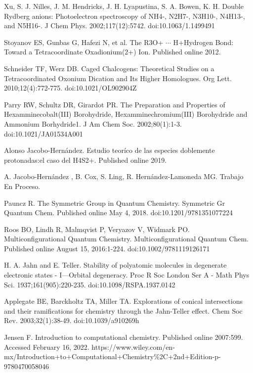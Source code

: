 \documentclass[12pt]{report}
\begin{document}
\begin{thebibliography}{13}
 Xu, S. J. Nilles, J. M. Hendricks, J. H. Lyapustina, S. A. Bowen, K. H. Double Rydberg anions: Photoelectron spectroscopy of NH4-, N2H7-, N3H10-, N4H13-, and N5H16-. J Chem Phys. 2002;117(12):5742. doi:10.1063/1.1499491




 Stoyanov ES, Gunbas G, Hafezi N, et al. The R3O+ $\dotsi$ H+Hydrogen Bond: Toward a Tetracoordinate Oxadionium(2+) Ion. Published online 2012.


  Schneider TF, Werz DB. Caged Chalcogens: Theoretical Studies on a Tetracoordinated Oxonium Dication and Its Higher Homologues. Org Lett. 2010;12(4):772-775. doi:10.1021/OL902904Z


  Parry RW, Schultz DR, Girardot PR. The Preparation and Properties of Hexamminecobalt(III) Borohydride, Hexamminechromium(III) Borohydride and Ammonium Borhydride1. J Am Chem Soc. 2002;80(1):1-3. doi:10.1021/JA01534A001

  Alonso Jacobo-Hernández. Estudio teoríco de las especies doblemente protonadas:el caso del H4S2+. Published online 2019.

 A. 	Jacobo-Hernández  , B. Cox, S. Ling, R. Hernández-Lamoneda MG. Trabajo En Proceso.

  Pauncz R. The Symmetric Group in Quantum Chemistry. Symmetric Gr Quantum Chem. Published online May 4, 2018. doi:10.1201/9781351077224

 Roos BO, Lindh R, Malmqvist P, Veryazov V, Widmark PO. Multiconfigurational Quantum Chemistry. Multiconfigurational Quantum Chem. Published online August 15, 2016:1-224. doi:10.1002/9781119126171


  H. A. Jahn and E. Teller. Stability of polyatomic molecules in degenerate electronic states - I—Orbital degeneracy. Proc R Soc London Ser A - Math Phys Sci. 1937;161(905):220-235. doi:10.1098/RSPA.1937.0142


 Applegate BE, Barckholtz TA, Miller TA. Explorations of conical intersections and their ramifications for chemistry through the Jahn-Teller effect. Chem Soc Rev. 2003;32(1):38-49. doi:10.1039/a910269h

 Jensen F. Introduction to computational chemistry. Published online 2007:599. Accessed February 16, 2022. https://www.wiley.com/en-mx/Introduction+to+Computational+Chemistry\%2C+2nd+Edition-p-9780470058046



\end{thebibliography}
\end{document}
